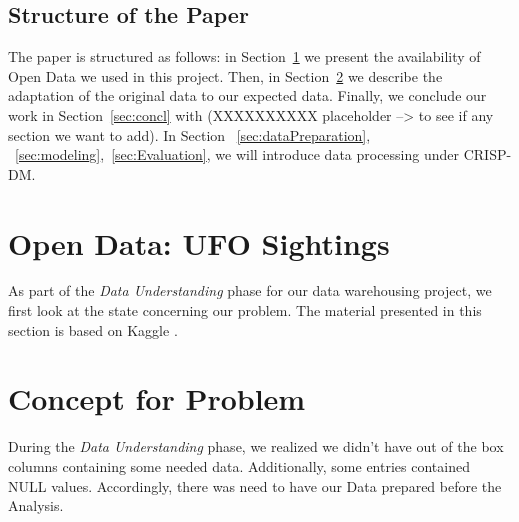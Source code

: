 \documentclass[11pt, journal]{IEEEtran}
\begin{document}
\subsection{Structure of the Paper} \label{subsec:struct}
The paper is structured as follows: in Section~\ref{sec:dataunderstanding} we present the availability of Open Data we used in this project.
Then, in Section~\ref{sec:concept} we describe the adaptation of the original data to our expected data. Finally, we conclude our work in Section~\ref{sec:concl} with (XXXXXXXXXX placeholder --> to see if any section we want to add).
In Section ~\ref{sec:dataPreparation}, ~\ref{sec:modeling},~\ref{sec:Evaluation}, we will introduce data processing under CRISP-DM.


\section{Open Data: UFO Sightings} \label{sec:dataunderstanding}
As part of the \emph{Data Understanding} phase for our data warehousing project, we first look at the state concerning our problem. The material presented in this section is based on Kaggle \cite{kaggle}.

\section{Concept for Problem} \label{sec:concept}
During the \emph{Data Understanding} phase, we realized we didn't have out of the box columns containing some needed data. Additionally, some entries contained NULL values. Accordingly, there was need to have our Data prepared before the Analysis.
\end{document}
